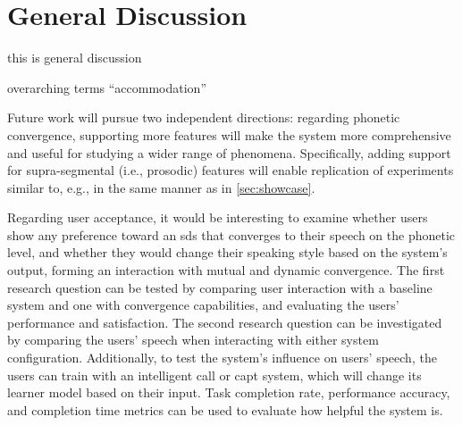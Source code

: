 \chapter*{General Discussion}
\label{chap:general_discussion}


\acresetall

this is general discussion

overarching terms \enquote{accommodation}




\citet{Babel2012role} %


\citet{Levitan2016implementing} %


Future work will pursue two independent directions:
regarding phonetic convergence, supporting more features will make the system more comprehensive and useful for studying a wider range of phenomena.
Specifically, adding support for supra-segmental (i.e., prosodic) features will enable replication of experiments similar to, e.g., \citet{Levitan2014acoustic, Levitan2016implementing} in the same manner as in \cref{sec:showcase}.

Regarding user acceptance, it would be interesting to examine whether users show any preference toward an \ac{sds} that converges to their speech on the phonetic level, and whether they would change their speaking style based on the system's output, forming an interaction with mutual and dynamic convergence.
The first research question can be tested by comparing user interaction with a baseline system and one with convergence capabilities, and evaluating the users' performance and satisfaction.
The second research question can be investigated by comparing the users' speech when interacting with either system configuration.
Additionally, to test the system's influence on users' speech, the users can train with an intelligent \acf{call} or \acf{capt} system, which will change its learner model based on their input.
Task completion rate, performance accuracy, and completion time metrics can be used to evaluate how helpful the system is.

